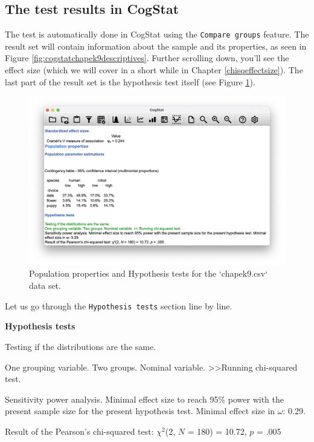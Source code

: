 \documentclass[
]{book}
\theoremstyle{definition}
\theoremstyle{definition}
\theoremstyle{definition}
\theoremstyle{definition}
\theoremstyle{remark}
\begin{document}
\hypertarget{AssocTestInCogStat}{%
\subsection{The test results in CogStat}\label{AssocTestInCogStat}}

The test is automatically done in CogStat using the \texttt{Compare\ groups} feature. The result set will contain information about the sample and its properties, as seen in Figure \ref{fig:cogstatchapek9descriptives}. Further scrolling down, you'll see the effect size (which we will cover in a short while in Chapter \ref{chisqeffectsize}). The last part of the result set is the hypothesis test itself (see Figure \ref{fig:cogstatchapek9hypo}).

\begin{figure}

{\centering \includegraphics[width=0.66\linewidth]{resources/image/cogstatchapek9hypo} 

}

\caption{Population properties and Hypothesis tests for the `chapek9.csv` data set.}\label{fig:cogstatchapek9hypo}
\end{figure}

Let us go through the \texttt{Hypothesis\ tests} section line by line.

\begin{tcolorbox}[colback=white,
  colframe=lightgray,
  coltext=black,
  boxsep=4pt,
  boxrule=0.3pt,
  arc=0pt]
  {   \sffamily
      \color{CSblue}\textbf{Hypothesis tests}
      
      \color{CSgreen}Testing if the distributions are the same.
      
      One grouping variable. Two groups. Nominal variable. \textgreater\textgreater  Running chi-squared test.
      
      \color{black}
      Sensitivity power analysis. Minimal effect size to reach 95\% power with the present sample size for the present hypothesis test. Minimal effect size in $\omega$: 0.29.
      
      Result of the Pearson's chi-squared test: $\chi^2$(2, $N$ = 180) = 10.72, $p$ = .005
      \normalfont
  }
\end{tcolorbox}
\end{document}
